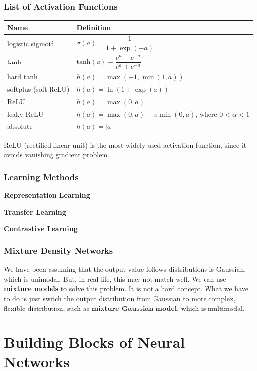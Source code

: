 \documentclass{report}
\begin{document}
        \subsubsection{List of Activation Functions}
            \begin{center}
                \begin{tabularx}{\textwidth}{XX}
                \toprule
                \textbf{Name} & \textbf{Definition}
                \\
                \midrule
                logistic sigmoid & $\sigma(a)=\dfrac{1}{1+\exp{(-a)}}$
                \\
                \midrule
                tanh & $\text{tanh}(a)=\dfrac{e^a-e^{-a}}{e^a+e^{-a}}$
                \\
                \midrule
                hard tanh & $h(a)=\max{(-1, \min{(1,a)})}$
                \\
                \midrule
                softplus (soft ReLU) & $h(a)=\ln{(1+\exp{(a)})}$
                \\
                \midrule
                ReLU & $h(a)=\max{(0,a)}$
                \\
                \midrule
                leaky ReLU & $h(a)=\max{(0,a)} + \alpha \min{(0,a)}$, where $0<\alpha<1$
                \\
                \midrule
                absolute & $h(a)=\vert a \vert$
                \\
                \bottomrule
                \end{tabularx}
            \end{center}

            ReLU (rectified linear unit) is the most widely used activation function, since it avoids vanishing gradient problem.
        \subsubsection{Learning Methods} 
            \textbf{Representation Learning}

            \textbf{Transfer Learning}

            \textbf{Contrastive Learning}
    
        \subsubsection{Mixture Density Networks}
        We have been assuming that the output value follows distributions is Gaussian, which is unimodal.
        But, in real life, this may not match well.
        We can use \textbf{mixture models} to solve this problem. It is not a hard concept.
        What we have to do is just switch the output distribution from Gaussian to more complex, flexible distribution,
        such as \textbf{mixture Gaussian model}, which is multimodal.

    \section{Building Blocks of Neural Networks}
\end{document}
